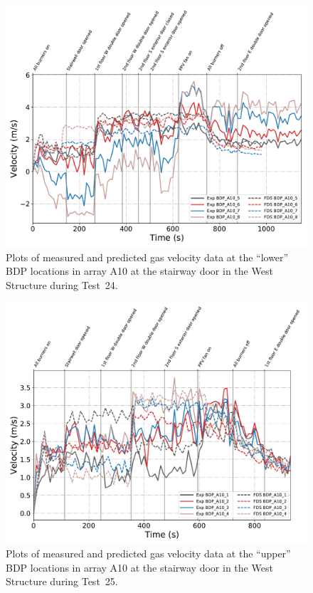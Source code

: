 \begin{figure}[!h]
	\centering
	\includegraphics[width=\columnwidth]{Figures/Plots/Validation/Velocity/Test_24_BDP_A10_lower}
	\caption[Plots of measured and predicted gas velocity data at ``lower'' BDP locations in A10 during Test~24.]{Plots of measured and predicted gas velocity data at the ``lower'' BDP locations in array A10 at the stairway door in the West Structure during Test~24.}
	\label{fig:Test24_lower_BDPs}
\end{figure}

\begin{figure}[!h]
	\centering
	\includegraphics[width=\columnwidth]{Figures/Plots/Validation/Velocity/Test_25_BDP_A10_upper}
	\caption[Plots of measured and predicted gas velocity data at ``upper'' BDP locations in A10 during Test~25.]{Plots of measured and predicted gas velocity data at the ``upper'' BDP locations in array A10 at the stairway door in the West Structure during Test~25.}
	\label{fig:Test25_upper_BDPs}
\end{figure}

